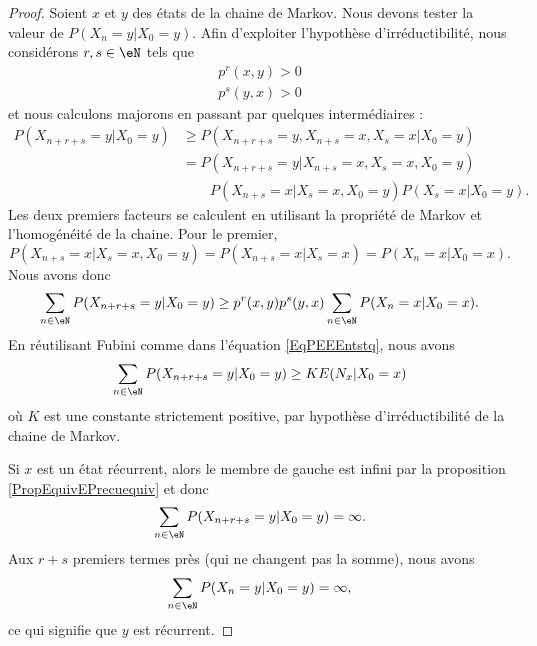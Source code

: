 \begin{proof}
	Soient \( x\) et \( y\) des états de la chaine de Markov. Nous devons tester la valeur de \( P(X_n=y|X_0=y)\). Afin d'exploiter l'hypothèse d'irréductibilité, nous considérons \( r,s\in\eN\) tels que
	\begin{subequations}
		\begin{align}
			p^r(x,y)>0 \\
			p^s(y,x)>0
		\end{align}
	\end{subequations}
	et nous calculons majorons en passant par quelques intermédiaires :
	\begin{subequations}
		\begin{align}
			P(X_{n+r+s}=y|X_0=y) & \geq P(X_{n+r+s}=y,X_{n+s}=x,X_s=x|X_0=y)               \\
			                     & =P(X_{n+r+s}=y|X_{n+s}=x,X_s=x,X_0=y)                   \\
			                     & \qquad P(X_{n+s}=x|X_s=x,X_0=y)P(X_s=x|X_0=y)\nonumber.
		\end{align}
	\end{subequations}
	Les deux premiers facteurs se calculent en utilisant la propriété de Markov et l'homogénéité de la chaine. Pour le premier,
	\begin{equation}
		P(X_{n+s}=x|X_s=x,X_0=y)=P(X_{n+s}=x|X_s=x)=P(X_n=x|X_0=x).
	\end{equation}
	Nous avons donc
	\begin{equation}        \label{EqRmuXtG}
		\sum_{n\in\eN}P(X_{n+r+s}=y|X_0=y)\geq p^r(x,y)p^s(y,x)\sum_{n\in\eN}P(X_n=x|X_0=x).
	\end{equation}
	En réutilisant Fubini comme dans l'équation \eqref{EqPEEEntstq}, nous avons
	\begin{equation}
		\sum_{n\in \eN}P(X_{n+r+s}=y|X_0=y)\geq KE(N_x|X_0=x)
	\end{equation}
	où \( K\) est une constante strictement positive, par hypothèse d'irréductibilité de la chaine de Markov.

	Si \( x\) est un état récurrent, alors le membre de gauche est infini par la proposition \eqref{PropEquivEPrecuequiv} et donc
	\begin{equation}
		\sum_{n\in\eN}P(X_{n+r+s}=y|X_0=y)=\infty.
	\end{equation}
	Aux \( r+s\) premiers termes près (qui ne changent pas la somme), nous avons
	\begin{equation}
		\sum_{n\in\eN}P(X_n=y|X_0=y)=\infty,
	\end{equation}
	ce qui signifie que \( y\) est récurrent.
\end{proof}

